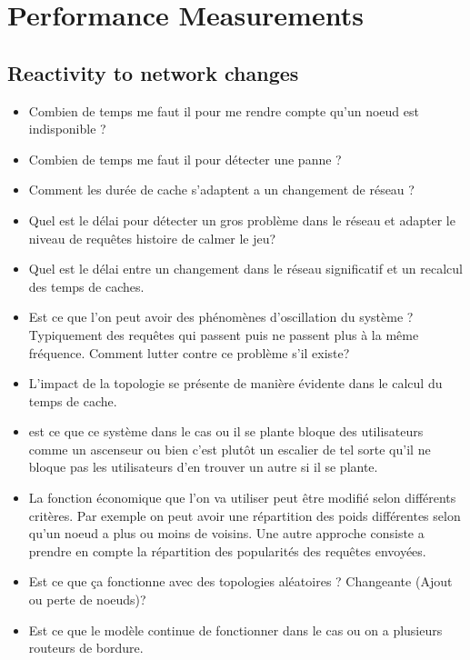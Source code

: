 \section{Performance Measurements} %
\label{sec:performance_measurements}

\subsection{Reactivity to network changes} %
\label{sub:reactivity_to_network_changes}

\begin{itemize}
	\item Combien de temps me faut il pour me rendre compte qu'un noeud est indisponible ?
	\item Combien de temps me faut il pour détecter une panne ?
	\item Comment les durée de cache s'adaptent a un changement de réseau ?
	\item Quel est le délai pour détecter un gros problème dans le réseau et adapter le niveau de requêtes histoire de calmer le jeu?
	\item Quel est le délai entre un changement dans le réseau significatif et un recalcul des temps de caches.
	\item Est ce que l'on peut avoir des phénomènes d'oscillation du système ? Typiquement des requêtes qui passent puis ne passent plus à la même fréquence. Comment lutter contre ce problème s'il existe?
	\item L'impact de la topologie se présente de manière évidente dans le calcul du temps de cache.

	\item est ce que ce système dans le cas ou il se plante bloque des utilisateurs comme 
	un ascenseur ou bien c'est plutôt un escalier de tel sorte qu'il ne bloque pas les utilisateurs d'en trouver un autre si il se plante.

	\item La fonction économique que l'on va utiliser peut être modifié selon différents critères. Par exemple on peut avoir une répartition des poids différentes selon qu'un noeud a plus ou moins de voisins. Une autre approche consiste a prendre en compte la répartition des popularités des requêtes envoyées.

	\item Est ce que ça fonctionne avec des topologies aléatoires ? Changeante (Ajout ou perte de noeuds)?

	\item Est ce que le modèle continue de fonctionner dans le cas ou on a plusieurs routeurs de bordure.	

\end{itemize}

